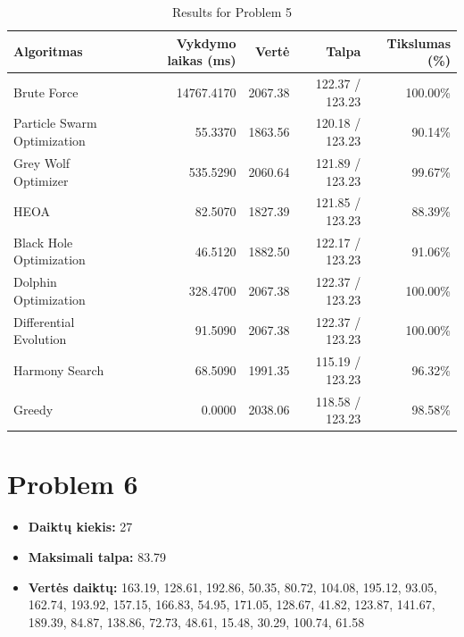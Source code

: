 \documentclass[a4paper,11pt]{article}
\begin{document}
\begin{table}[h!]
\centering
\begin{tabular}{lrrrr}
\toprule
\textbf{Algoritmas} & \textbf{Vykdymo laikas (ms)} & \textbf{Vertė} & \textbf{Talpa} & \textbf{Tikslumas (\%)} \\
\midrule
Brute Force & 14767.4170 & 2067.38 & 122.37 / 123.23 & 100.00\% \\
Particle Swarm Optimization & 55.3370 & 1863.56 & 120.18 / 123.23 & 90.14\% \\
Grey Wolf Optimizer & 535.5290 & 2060.64 & 121.89 / 123.23 & 99.67\% \\
HEOA & 82.5070 & 1827.39 & 121.85 / 123.23 & 88.39\% \\
Black Hole Optimization & 46.5120 & 1882.50 & 122.17 / 123.23 & 91.06\% \\
Dolphin Optimization & 328.4700 & 2067.38 & 122.37 / 123.23 & 100.00\% \\
Differential Evolution & 91.5090 & 2067.38 & 122.37 / 123.23 & 100.00\% \\
Harmony Search & 68.5090 & 1991.35 & 115.19 / 123.23 & 96.32\% \\
Greedy & 0.0000 & 2038.06 & 118.58 / 123.23 & 98.58\% \\
\bottomrule
\end{tabular}
\caption{Results for Problem 5}
\end{table}
\clearpage

\section*{Problem 6}
\begin{itemize}
    \item \textbf{Daiktų kiekis:} 27
    \item \textbf{Maksimali talpa:} 83.79
    \item \textbf{Vertės daiktų:} 163.19, 128.61, 192.86, 50.35, 80.72, 104.08, 195.12, 93.05, 162.74, 193.92, 157.15, 166.83, 54.95, 171.05, 128.67, 41.82, 123.87, 141.67, 189.39, 84.87, 138.86, 72.73, 48.61, 15.48, 30.29, 100.74, 61.58
\end{itemize}
\end{document}
